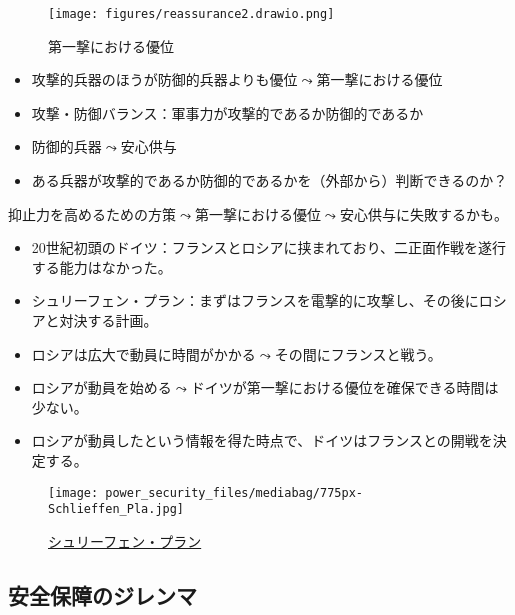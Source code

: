 \documentclass[
  xelatex,
  ja=standard]{bxjsarticle}
\providecommand{\tightlist}{%
  \setlength{\itemsep}{0pt}\setlength{\parskip}{0pt}}\usepackage{longtable,booktabs,array}
\begin{document}
\begin{figure}[htpb]

{\centering \texttt{[image: figures/reassurance2.drawio.png]}

}

\caption{第一撃における優位}

\end{figure}

\begin{itemize}
\tightlist
\item
  攻撃的兵器のほうが防御的兵器よりも優位\(\leadsto\)第一撃における優位
\item
  攻撃・防御バランス：軍事力が攻撃的であるか防御的であるか
\item
  防御的兵器\(\leadsto\)安心供与
\item
  ある兵器が攻撃的であるか防御的であるかを（外部から）判断できるのか？
\end{itemize}

抑止力を高めるための方策\(\leadsto\)第一撃における優位\(\leadsto\)安心供与に失敗するかも。

\begin{itemize}
\tightlist
\item
  20世紀初頭のドイツ：フランスとロシアに挟まれており、二正面作戦を遂行する能力はなかった。
\item
  シュリーフェン・プラン：まずはフランスを電撃的に攻撃し、その後にロシアと対決する計画。
\item
  ロシアは広大で動員に時間がかかる\(\leadsto\)その間にフランスと戦う。
\item
  ロシアが動員を始める\(\leadsto\)ドイツが第一撃における優位を確保できる時間は少ない。
\item
  ロシアが動員したという情報を得た時点で、ドイツはフランスとの開戦を決定する。
\end{itemize}

\begin{figure}[htpb]

{\centering \texttt{[image: power\_security\_files/mediabag/775px-Schlieffen\_Pla.jpg]}

}

\caption{\href{https://commons.wikimedia.org/wiki/File:Schlieffen_Plan.jpg}{シュリーフェン・プラン}}

\end{figure}

\hypertarget{ux5b89ux5168ux4fddux969cux306eux30b8ux30ecux30f3ux30de}{%
\subsection{安全保障のジレンマ}\label{ux5b89ux5168ux4fddux969cux306eux30b8ux30ecux30f3ux30de}}
\end{document}

